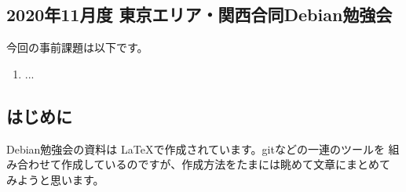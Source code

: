 \documentclass[mingoth,a4paper]{jsarticle}
\begin{document}

\subsection{2020年11月度 東京エリア・関西合同Debian勉強会}



今回の事前課題は以下です。

\begin{enumerate}
\item ...
\end{enumerate}


\begin{multicols}{2}
{\small
% 
}
\end{multicols}

%
%
%
%




\label{sec:debmtg2020howtoprepare}

\subsection{はじめに}

Debian勉強会の資料は \LaTeX で作成されています。gitなどの一連のツールを
組み合わせて作成しているのですが、作成方法をたまには眺めて文章にまとめて
みようと思います。
\end{document}
